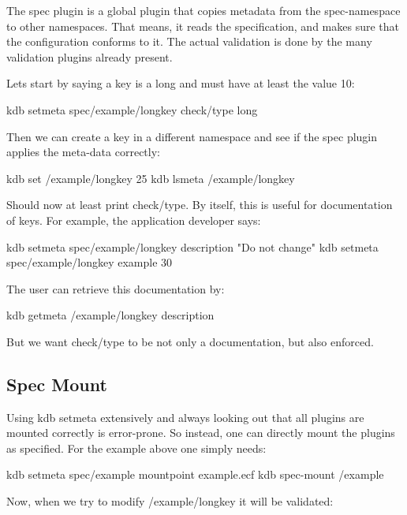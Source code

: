 The spec plugin is a global plugin that copies metadata from the {\ttfamily spec}-\/namespace to other namespaces. That means, it reads the specification, and makes sure that the configuration conforms to it. The actual validation is done by the many validation plugins already present.

Lets start by saying a key is a long and must have at least the value 10\+: \begin{DoxyVerb}    kdb setmeta spec/example/longkey check/type long
\end{DoxyVerb}


Then we can create a key in a different namespace and see if the {\ttfamily spec} plugin applies the meta-\/data correctly\+: \begin{DoxyVerb}    kdb set /example/longkey 25
    kdb lsmeta /example/longkey
\end{DoxyVerb}


Should now at least print {\ttfamily check/type}. By itself, this is useful for documentation of keys. For example, the application developer says\+: \begin{DoxyVerb}    kdb setmeta spec/example/longkey description "Do not change"
    kdb setmeta spec/example/longkey example 30
\end{DoxyVerb}


The user can retrieve this documentation by\+: \begin{DoxyVerb}    kdb getmeta /example/longkey description
\end{DoxyVerb}


But we want {\ttfamily check/type} to be not only a documentation, but also enforced.

\subsection*{Spec Mount}

Using {\ttfamily kdb setmeta} extensively and always looking out that all plugins are mounted correctly is error-\/prone. So instead, one can directly mount the plugins as specified. For the example above one simply needs\+: \begin{DoxyVerb}    kdb setmeta spec/example mountpoint example.ecf
    kdb spec-mount /example
\end{DoxyVerb}


Now, when we try to modify {\ttfamily /example/longkey} it will be validated\+: 


